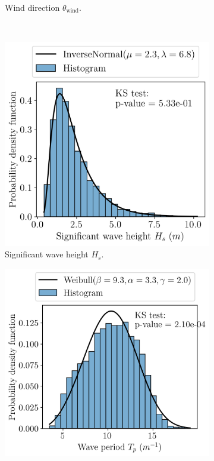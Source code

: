 \begin{figure}
\begin{subfigure}[b]{0.32\textwidth}
        \caption{Wind direction $\theta_{\mathrm{wind}}$.}
    \end{subfigure}
    \\
    \begin{subfigure}[b]{0.32\textwidth}
        \centering
        \includegraphics[width=\linewidth]{../numerical_experiments/chapter3/figures/Hs_distribution_SB.png}
        \caption{Significant wave height $H_s$.}
    \end{subfigure}
    \begin{subfigure}[b]{0.32\textwidth}
        \centering
        \includegraphics[width=\linewidth]{../numerical_experiments/chapter3/figures/Tp_distribution_SB.png}

\end{subfigure}
\end{figure}
